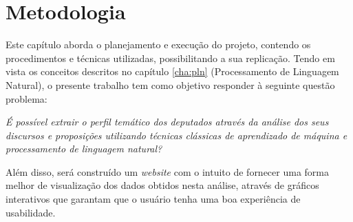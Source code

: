 \chapter{Metodologia}

Este capítulo aborda o planejamento e execução do projeto, contendo os procedimentos e técnicas utilizadas, possibilitando a sua  replicação. Tendo em vista os conceitos descritos no capítulo \ref{cha:pln} (Processamento de Linguagem Natural), o presente trabalho tem como objetivo responder à seguinte questão problema:

\begin{center}
\textit{É possível extrair o perfil temático dos deputados através da análise dos seus discursos e proposições utilizando técnicas clássicas de aprendizado de máquina e processamento de linguagem natural?}
\end{center}

Além disso, será construído um \textit{website} com o intuito de fornecer uma forma melhor de visualização dos dados obtidos nesta análise, através de gráficos interativos que garantam que o usuário tenha uma boa experiência de usabilidade.




